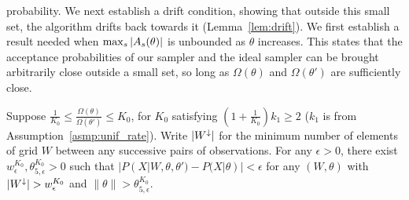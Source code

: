 probability. We next establish a drift condition, showing that outside 
this small set, the algorithm drifts back towards it 
(Lemma~\ref{lem:drift}).
We first establish a result needed when ${\max_s |A_s(\theta)|}$ is unbounded 
as $\theta$ increases.
This states that the acceptance probabilities of our 
sampler and the ideal sampler can be brought arbitrarily close
outside a small set, so long as $\Omega(\theta)$ and
$\Omega(\theta')$ are sufficiently close.
  \begin{lemma}
  Suppose %
  $\frac{1}{K_0} \le \frac{\Omega(\theta)}{\Omega(\theta')} \leq K_0
  $, for $K_0$ satisfying $(1 + \frac{1}{K_0})k_1 \ge 2$  
  ($k_1$ is from Assumption~\ref{asmp:unif_rate}). Write ${|W^\downarrow}|$ for the
  minimum number of elements of grid $W$ between any successive pairs of observations.
  For any $\epsilon > 0$, there exist  $w^{K_0}_\epsilon,  \theta_{5, \epsilon}^{K_0} > 0$ such that
  $|P(X| W, \theta, \theta') - P(X | \theta)| < \epsilon$
  for any $(W, \theta)$ with ${|W^\downarrow}| > w^{K_0}_\epsilon$ and $\| \theta \| > \theta_{5, \epsilon}^{K_0}$.
  \label{lem:eigenvalue_lemma}
  \end{lemma}

